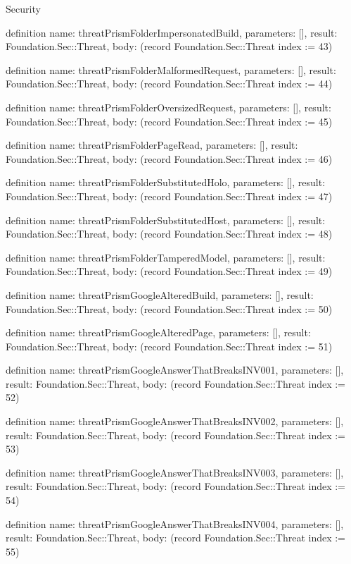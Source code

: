 \begin{lexlean}{Security}
\begin{semanticmodule}
definition{
  name: threatPrismFolderImpersonatedBuild,
  parameters: [],
  result: Foundation.Sec::Threat,
  body: (record Foundation.Sec::Threat {index := 43})
}

definition{
  name: threatPrismFolderMalformedRequest,
  parameters: [],
  result: Foundation.Sec::Threat,
  body: (record Foundation.Sec::Threat {index := 44})
}

definition{
  name: threatPrismFolderOversizedRequest,
  parameters: [],
  result: Foundation.Sec::Threat,
  body: (record Foundation.Sec::Threat {index := 45})
}

definition{
  name: threatPrismFolderPageRead,
  parameters: [],
  result: Foundation.Sec::Threat,
  body: (record Foundation.Sec::Threat {index := 46})
}

definition{
  name: threatPrismFolderSubstitutedHolo,
  parameters: [],
  result: Foundation.Sec::Threat,
  body: (record Foundation.Sec::Threat {index := 47})
}

definition{
  name: threatPrismFolderSubstitutedHost,
  parameters: [],
  result: Foundation.Sec::Threat,
  body: (record Foundation.Sec::Threat {index := 48})
}

definition{
  name: threatPrismFolderTamperedModel,
  parameters: [],
  result: Foundation.Sec::Threat,
  body: (record Foundation.Sec::Threat {index := 49})
}

definition{
  name: threatPrismGoogleAlteredBuild,
  parameters: [],
  result: Foundation.Sec::Threat,
  body: (record Foundation.Sec::Threat {index := 50})
}

definition{
  name: threatPrismGoogleAlteredPage,
  parameters: [],
  result: Foundation.Sec::Threat,
  body: (record Foundation.Sec::Threat {index := 51})
}

definition{
  name: threatPrismGoogleAnswerThatBreaksINV001,
  parameters: [],
  result: Foundation.Sec::Threat,
  body: (record Foundation.Sec::Threat {index := 52})
}

definition{
  name: threatPrismGoogleAnswerThatBreaksINV002,
  parameters: [],
  result: Foundation.Sec::Threat,
  body: (record Foundation.Sec::Threat {index := 53})
}

definition{
  name: threatPrismGoogleAnswerThatBreaksINV003,
  parameters: [],
  result: Foundation.Sec::Threat,
  body: (record Foundation.Sec::Threat {index := 54})
}

definition{
  name: threatPrismGoogleAnswerThatBreaksINV004,
  parameters: [],
  result: Foundation.Sec::Threat,
  body: (record Foundation.Sec::Threat {index := 55})
}


\end{semanticmodule}
\end{lexlean}
